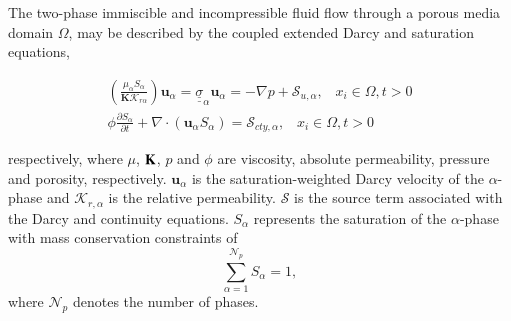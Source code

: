 \documentclass[preprint,authoryear,12pt]{elsarticle}
\begin{document}

\medskip
The two-phase immiscible and incompressible fluid flow through a porous media domain $\Omega$, may be described by the coupled extended Darcy and saturation equations,

\begin{eqnarray}
\left(\displaystyle\frac{\mu_{\alpha}S_{\alpha}}{{\mathbf K}\mathcal{K}_{r\alpha}}\right) {\mathbf u}_{\alpha} = \underline{\underline{\sigma}}_{\alpha} {\mathbf u}_{\alpha} = -\nabla p + \mathcal{S}_{u,\alpha},\;\;\; x_{i}\in\Omega, t>0 \label{eqn:darcy_eqn} \\
\phi\displaystyle\frac{\partial S_{\alpha} }{\partial t} +   \nabla \cdot \left( {\mathbf u}_{\alpha}  S_{\alpha}\right) =  \mathcal{S}_{cty,\alpha},\;\;\; x_{i}\in\Omega, t>0\label{eqn:saturation_eqn}
\end{eqnarray} 

\noindent respectively, where $\mu$, ${\bf K}$, $p$ and $\phi$ are viscosity, absolute permeability, pressure and porosity, respectively. ${\mathbf u}_{\alpha}$ is the saturation-weighted Darcy velocity of the $\alpha$-phase and $\mathcal{K}_{r,\alpha}$ is the relative permeability. $\mathcal{S}$ is the source term associated with the Darcy and continuity equations. $S_{\alpha}$ represents the saturation of the $\alpha$-phase with mass conservation constraints of 
\begin{displaymath}
\sum\limits_{\alpha=1}^{\mathcal{N}_{p}} S_{\alpha} = 1, 
\end{displaymath}
where $\mathcal{N}_{p}$ denotes the number of phases.

\end{document}
